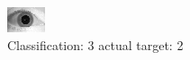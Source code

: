 \begin{figure}[h!]
\begin{center}
\includegraphics[width=0.60\columnwidth]{figures/ID1750_class_3_target_2.png}
\end{center}
\caption{ Classification: 3 actual target: 2}
\label{fig:ID1750_class_3_target_2}
\end{figure}
